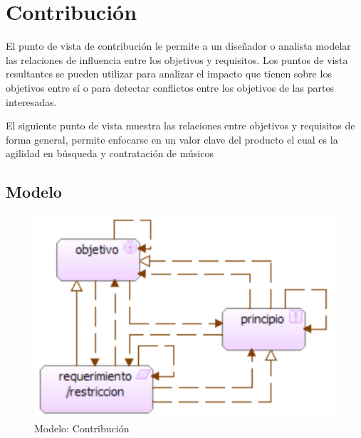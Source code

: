 \newpage

\section{Contribución}
El punto de vista de contribución le permite a un diseñador o analista modelar las relaciones de influencia entre los objetivos y requisitos. Los puntos de vista resultantes se pueden utilizar para analizar el impacto que tienen sobre los objetivos entre sí o para detectar conflictos entre los objetivos de las partes interesadas.
 \cite{ArchiMat55:online} \vspace{\baselineskip}

El siguiente punto de vista muestra las relaciones entre objetivos y requisitos de forma general, permite enfocarse en un valor clave del producto el cual es la agilidad en búsqueda y contratación de músicos

\subsection{Modelo}
\begin{figure}[h!]
	\centering
	\includegraphics[width=0.6\linewidth]{Arquitectura/Motivacion/imgs/ContribucionMetamodelo.PNG}
	\caption{Modelo: Contribución}
\end{figure}
\newpage
